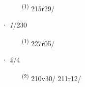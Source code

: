 \begin{description}
    \item[]  \textsuperscript{(1)} \mbox{215r29/}
\end{description}
\ENTRYEND
\noindent{} · \textit{1}/230 \LEMMALINE
\begin{description}
    \item[]  \textsuperscript{(1)} \mbox{227r05/}
\end{description}
\ENTRYEND
\noindent{} · \textit{2}/4 \LEMMALINE
\begin{description}
    \item[]  \textsuperscript{(2)} \mbox{210v30/} \mbox{211r12/}
\end{description}
\ENTRYEND
